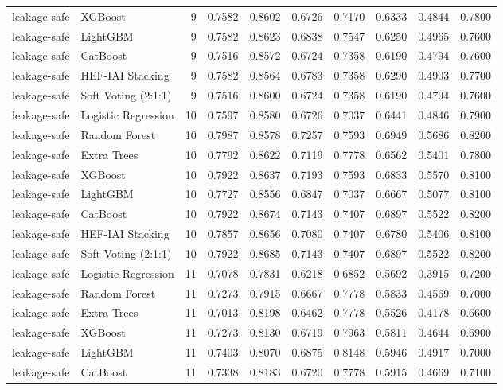 \begin{tabular}{llrrrrrrrr}
leakage-safe & XGBoost & 9 & 0.7582 & 0.8602 & 0.6726 & 0.7170 & 0.6333 & 0.4844 & 0.7800 \\
leakage-safe & LightGBM & 9 & 0.7582 & 0.8623 & 0.6838 & 0.7547 & 0.6250 & 0.4965 & 0.7600 \\
leakage-safe & CatBoost & 9 & 0.7516 & 0.8572 & 0.6724 & 0.7358 & 0.6190 & 0.4794 & 0.7600 \\
leakage-safe & HEF-IAI Stacking & 9 & 0.7582 & 0.8564 & 0.6783 & 0.7358 & 0.6290 & 0.4903 & 0.7700 \\
leakage-safe & Soft Voting (2:1:1) & 9 & 0.7516 & 0.8600 & 0.6724 & 0.7358 & 0.6190 & 0.4794 & 0.7600 \\
leakage-safe & Logistic Regression & 10 & 0.7597 & 0.8580 & 0.6726 & 0.7037 & 0.6441 & 0.4846 & 0.7900 \\
leakage-safe & Random Forest & 10 & 0.7987 & 0.8578 & 0.7257 & 0.7593 & 0.6949 & 0.5686 & 0.8200 \\
leakage-safe & Extra Trees & 10 & 0.7792 & 0.8622 & 0.7119 & 0.7778 & 0.6562 & 0.5401 & 0.7800 \\
leakage-safe & XGBoost & 10 & 0.7922 & 0.8637 & 0.7193 & 0.7593 & 0.6833 & 0.5570 & 0.8100 \\
leakage-safe & LightGBM & 10 & 0.7727 & 0.8556 & 0.6847 & 0.7037 & 0.6667 & 0.5077 & 0.8100 \\
leakage-safe & CatBoost & 10 & 0.7922 & 0.8674 & 0.7143 & 0.7407 & 0.6897 & 0.5522 & 0.8200 \\
leakage-safe & HEF-IAI Stacking & 10 & 0.7857 & 0.8656 & 0.7080 & 0.7407 & 0.6780 & 0.5406 & 0.8100 \\
leakage-safe & Soft Voting (2:1:1) & 10 & 0.7922 & 0.8685 & 0.7143 & 0.7407 & 0.6897 & 0.5522 & 0.8200 \\
leakage-safe & Logistic Regression & 11 & 0.7078 & 0.7831 & 0.6218 & 0.6852 & 0.5692 & 0.3915 & 0.7200 \\
leakage-safe & Random Forest & 11 & 0.7273 & 0.7915 & 0.6667 & 0.7778 & 0.5833 & 0.4569 & 0.7000 \\
leakage-safe & Extra Trees & 11 & 0.7013 & 0.8198 & 0.6462 & 0.7778 & 0.5526 & 0.4178 & 0.6600 \\
leakage-safe & XGBoost & 11 & 0.7273 & 0.8130 & 0.6719 & 0.7963 & 0.5811 & 0.4644 & 0.6900 \\
leakage-safe & LightGBM & 11 & 0.7403 & 0.8070 & 0.6875 & 0.8148 & 0.5946 & 0.4917 & 0.7000 \\
leakage-safe & CatBoost & 11 & 0.7338 & 0.8183 & 0.6720 & 0.7778 & 0.5915 & 0.4669 & 0.7100 \\

\end{tabular}

